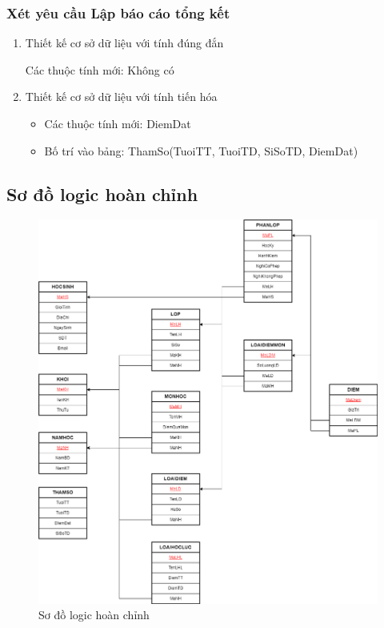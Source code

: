 \documentclass[a4paper]{article}
\begin{document}
\subsubsection{Xét yêu cầu Lập báo cáo tổng kết}
\begin{enumerate}
\item Thiết kế cơ sở dữ liệu với tính đúng đắn

Các thuộc tính mới: Không có
\item Thiết kế cơ sở dữ liệu với tính tiến hóa
\begin{itemize}
\item Các thuộc tính mới: DiemDat
\item Bố trí vào bảng: ThamSo(TuoiTT, TuoiTD, SiSoTD, DiemDat)
\end{itemize}
\end{enumerate}


	\subsection{Sơ đồ logic hoàn chỉnh}
	\begin{figure}[H] 
    \centering
    \includegraphics[width=1\textwidth]{logic} %
    \caption{Sơ đồ logic hoàn chỉnh}
    \label{fig:example} %
\end{figure}
\end{document}
